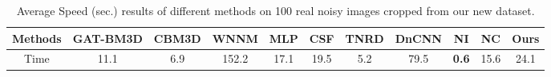 \begin{table}\vspace{-4mm}
\begin{adjustwidth}{-1cm}{}
\scriptsize
\caption{Average Speed (sec.) results of different methods on 100 real noisy images cropped from our new dataset.}
\vspace{-4mm}
\label{tab3-8}
\begin{center}
\renewcommand\arraystretch{1}
\begin{tabular}{|c||c|c|c|c|c|c|c|c|c|c|}
\hline
Methods
&\textbf{GAT-BM3D}
&\textbf{CBM3D}
&\textbf{WNNM}
&\textbf{MLP}
&\textbf{CSF} 
&\textbf{TNRD} 
&\textbf{DnCNN}
&\textbf{NI} 
&\textbf{NC} 
&\textbf{Ours} 
\\
\hline
Time  
& 11.1 & 6.9 & 152.2 & 17.1 & 19.5 & 5.2 & 79.5 & \textbf{0.6} & 15.6 & 24.1
\\
\hline
\end{tabular}
\end{center}
\end{adjustwidth}
\end{table}


